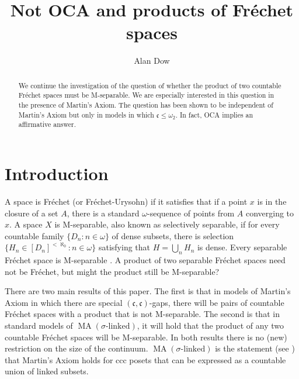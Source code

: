 \documentclass{amsart}
\theoremstyle{definition}
\theoremstyle{remark}
\begin{document}
\title{Not OCA and products of Fr\'echet spaces}
\author{Alan Dow}
\address{Department of Mathematics and Statistics, University
of North Carolina at Charlotte, Charlotte, NC, USA}

\begin{abstract}
We continue the investigation of the question of whether the product of two
countable Fr\'echet spaces must be M-separable. 
We are especially interested in this question in the presence
of Martin's Axiom.  The question has been shown to be
independent of Martin's Axiom but only in models in
which $\mathfrak c\leq\omega_2$.  In fact, OCA
implies an affirmative answer.
\end{abstract}


\maketitle

\section{Introduction}
A space is Fr\'echet (or Fr\'echet-Urysohn) if 
it satisfies that if a point $x$ is in the closure
of a set $A$, there is a standard $\omega$-sequence
of points from $A$ converging to $x$. 
A space $X$ is M-separable, also known as
selectively separable, if for every countable family
 $\{ D_n : n\in \omega \}$ of dense subsets, there is 
 selection $\{ H_n\in [D_n]^{<\aleph_0} : n\in \omega\}$ 
 satisfying that $H = \bigcup_n H_n$ is dense.
 Every
separable Fr\'echet space is M-separable \cite{BaDo1}.
A product of two separable Fr\'echet spaces need
not be Fr\'echet, but might the product still be
M-separable?  

There are two main results of this paper.
The first is   that in models
of Martin's Axiom in which there are special  
$(\mathfrak c, \mathfrak c)$-gaps, there will
be pairs of countable Fr\'echet spaces with a product
that is not M-separable. The second is that 
in standard models of $\operatorname{MA}(\sigma\mbox{-linked})$,
it will hold that the product of any two countable
Fr\'echet spaces will be M-separable. 
In both results there is no (new) restriction on the size
of the continuum.  
 $\operatorname{MA}(\sigma\mbox{-linked})$ is 
 the statement (see \cite{AvTo11}) that Martin's Axiom holds
 for ccc posets that can be expressed as a
 countable union of linked subsets.
 
\end{document}
